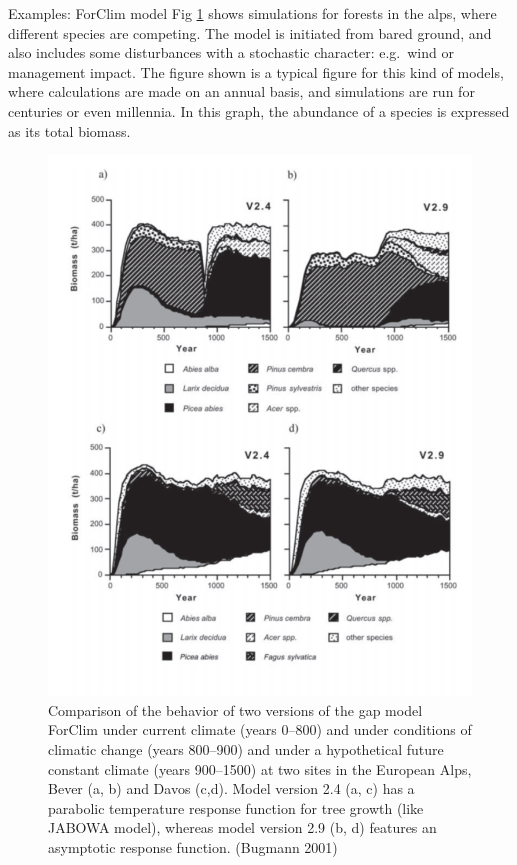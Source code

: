 \documentclass[12pt,oneside]{book}
\begin{document}
Examples: ForClim model Fig \ref{fig:f612} shows simulations for forests
in the alps, where different species are competing. The model is
initiated from bared ground, and also includes some disturbances with a
stochastic character: e.g.~wind or management impact. The figure shown
is a typical figure for this kind of models, where calculations are made
on an annual basis, and simulations are run for centuries or even
millennia. In this graph, the abundance of a species is expressed as its
total biomass.

\begin{figure}

{\centering \includegraphics[width=0.8\linewidth]{figures/chap6/f612_forclim_succession} 

}

\caption{Comparison of the behavior of two versions of the gap model ForClim under current climate (years 0–800) and under conditions of climatic change (years 800–900) and under a hypothetical future constant climate (years 900–1500) at two sites in the European Alps, Bever (a, b) and Davos (c,d). Model version 2.4 (a, c) has a parabolic temperature response function for tree growth (like JABOWA model), whereas model version 2.9 (b, d) features an asymptotic response function. (Bugmann 2001)}\label{fig:f612}
\end{figure}
\end{document}
